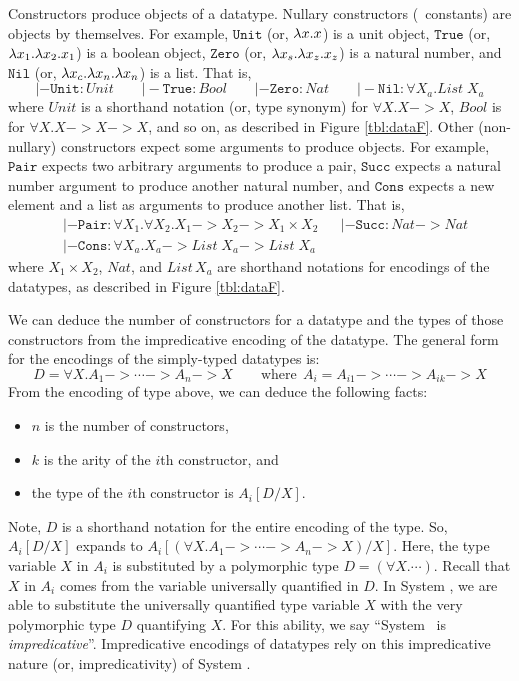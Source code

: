 Constructors produce objects of a datatype. Nullary constructors
(\aka\ constants) are objects by themselves. For example,
$\mathtt{Unit}$ (or, $\lambda x.x$) is a unit object,
$\mathtt{True}$ (or, $\lambda x_1.\lambda x_2. x_1$) is a boolean object,
$\mathtt{Zero}$ (or, $\lambda x_s. \lambda x_z. x_z$) is a natural number, and
$\mathtt{Nil}$ (or, $\lambda x_c.\lambda x_n.\lambda x_n$) is a list.
That is,
\[
|- \mathtt{Unit}:\textit{Unit} \qquad
|- \mathtt{True}:\textit{Bool} \qquad
|- \mathtt{Zero}:\textit{Nat} \qquad
|- \mathtt{Nil}:\forall X_a.\textit{List}\;X_a
\]
where $\textit{Unit}$ is a shorthand notation (or, type synonym)
for $\forall X.X -> X$, $Bool$ is for $\forall X.X -> X -> X$, and so on,
as described in Figure \ref{tbl:dataF}.
Other (non-nullary) constructors expect some arguments to produce objects.
For example, $\mathtt{Pair}$ expects two arbitrary arguments to produce a pair,
$\mathtt{Succ}$ expects a natural number argument to produce another
natural number, and $\mathtt{Cons}$ expects a new element and a list as
arguments to produce another list. That is,
\begin{align*}
& |- \mathtt{Pair} : \forall X_1. \forall X_2. X_1 -> X_2 -> X_1\times X_2
&& |- \mathtt{Succ} : \textit{Nat} -> \textit{Nat} \\ &
|- \mathtt{Cons} : \forall X_a. X_a -> \mathit{List}\;X_a -> \mathit{List}\;X_a
\end{align*}
where ${X_1 \times X_2}$, $\mathit{Nat}$, and $\mathit{List\,X_a}$
are shorthand notations for encodings of the datatypes,
as described in Figure \ref{tbl:dataF}.

We can deduce the number of constructors for a datatype and the types
of those constructors from the impredicative encoding of the datatype.
The general form for the encodings of the simply-typed datatypes is:
\[D = \forall X. A_1 -> \cdots -> A_n -> X
        \qquad\text{where}~~ A_i = A_{i1} -> \cdots -> A_{ik} -> X \]
From the encoding of type above, we can deduce the following facts:
\begin{itemize}
\item $n$ is the number of constructors,
\item $k$ is the arity of the $i$th constructor, and
\item the type of the $i$th constructor is $A_i[D/X]$.
\end{itemize}
Note, $D$ is a shorthand notation for the entire encoding of the type.
So, $A_i[D/X]$ expands to $A_i[(\forall X. A_1 -> \cdots -> A_n -> X)/ X]$.
Here, the type variable $X$ in $A_i$ is substituted by a polymorphic type
$D = (\forall X. \cdots)$. Recall that $X$ in $A_i$ comes from
the variable universally quantified in $D$. In System \F, we are able to
substitute the universally quantified type variable $X$ with
the very polymorphic type $D$ quantifying $X$. For this ability,
we say ``System \F\ is \emph{impredicative}''. Impredicative encodings
of datatypes rely on this impredicative nature (or, impredicativity)
of System \F.

